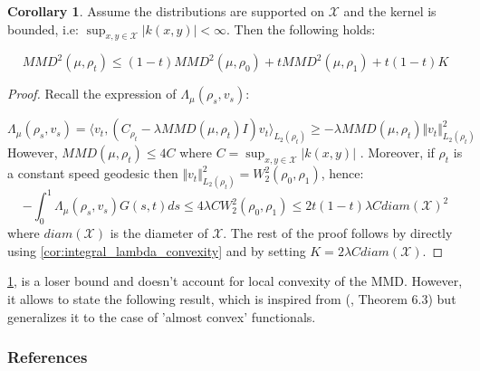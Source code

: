 \documentclass{article}
\newcommand{\1}{\mathbbm 1}
\theoremstyle{definition}
\newtheorem{corollary}[theorem]{Corollary}
\begin{document}
%
\begin{corollary}
\label{cor:loser_bound}Assume the distributions are supported on
$\mathcal{X}$ and the kernel is bounded, i.e: $\sup_{x,y\in\mathcal{X}}\vert k(x,y)\vert<\infty$.
Then the following holds:

\[
MMD^{2}(\mu,\rho_{t})\leq(1-t)MMD^{2}(\mu,\rho_{0})+tMMD^{2}(\mu,\rho_{1})+t(1-t)K
\]
\end{corollary}
%
\begin{proof}
Recall the expression of $\Lambda_{\mu}(\rho_{s},v_{s}):$

\[
\Lambda_{\mu}(\rho_{s},v_{s})=\langle v_{t},(C_{\rho_{t}}-\lambda MMD(\mu,\rho_{t})I)v_{t}\rangle_{L_{2}(\rho_{t})}\geq-\lambda MMD(\mu,\rho_{t})\Vert v_{t}\Vert_{L_{2}(\rho_{t})}^{2}
\]
However, $MMD(\mu,\rho_{t})\leq4C$ where $C=\sup_{x,y\in\mathcal{X}}\vert k(x,y)\vert$
. Moreover, if $\rho_{t}$ is a constant speed geodesic then $\Vert v_{t}\Vert_{L_{2}(\rho_{t})}^{2}=W_{2}^{2}(\rho_{0},\rho_{1})$,
hence: 
\[
-\int_{0}^{1}\Lambda_{\mu}(\rho_{s},v_{s})G(s,t)ds\leq4\lambda CW_{2}^{2}(\rho_{0},\rho_{1})\leq2t(1-t)\lambda Cdiam(\mathcal{X})^{2}
\]
where $diam(\mathcal{X})$ is the diameter of $\mathcal{X}$. The
rest of the proof follows by directly using \ref{cor:integral_lambda_convexity}
and by setting $K=2\lambda Cdiam(\mathcal{X})$.
\end{proof}
%
\ref{cor:loser_bound}, is a loser bound and doesn't account for local
convexity of the MMD. However, it allows to state the following result,
which is inspired from (\cite{Bottou:2017}, Theorem 6.3) but generalizes
it to the case of 'almost convex' functionals.


\subsubsection*{References}
\renewcommand\refname{\vskip -1cm}


\end{document}
